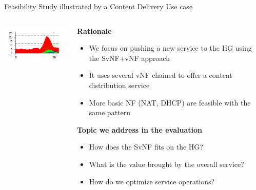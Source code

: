 \documentclass[a4paper]{beamer}
\begin{document}
\begin{frame}{Feasibility Study illustrated by a Content Delivery Use case}
	\begin{columns}[T]
		\begin{column}[T]{0.33 \textwidth} 
			\vspace{1.5cm}
			\includegraphics[width=12em]{results.png}
		\end{column}
										
		\begin{column}[T]{0.66\textwidth} 
										   
			\textbf{Rationale}
			\begin{itemize}
				\item We focus on pushing a new service to the HG using the SvNF+vNF approach
				\item It uses several vNF chained to offer a content distribution service
				\item More basic NF (NAT, DHCP) are feasible with the same pattern
			\end{itemize}
			\vspace{3mm}
			\textbf{Topic we address in the evaluation}
			\begin{itemize}
				\item How does the SvNF fits on the HG?
				\item What is the value brought by the overall service?
				\item How do we optimize service operations?
			\end{itemize}
		\end{column}
																										
	\end{columns}
								
\end{frame}
\end{document}
